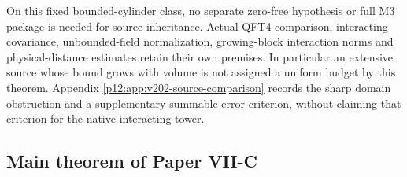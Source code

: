 \documentclass[12pt,a4paper]{article}
\begin{document}
On this fixed bounded-cylinder class, no separate zero-free hypothesis or
full M3 package is needed for source inheritance. Actual QFT4 comparison,
interacting covariance, unbounded-field normalization, growing-block
interaction norms and physical-distance estimates retain their own
premises. In particular an extensive source whose bound grows with
volume is not assigned a uniform budget by this theorem. Appendix
\ref{p12:app:v202-source-comparison} records the sharp domain obstruction
and a supplementary summable-error criterion, without claiming that
criterion for the native interacting tower.


\subsection{Main theorem of Paper VII-C}
\label{p12:sec:main-theorem}
\end{document}
